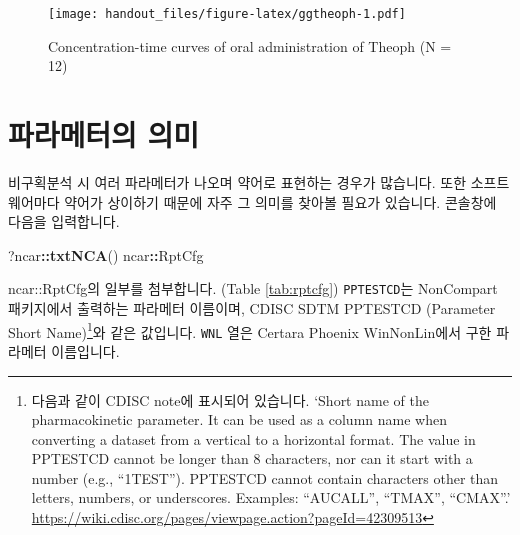 \documentclass[12pt,]{krantz}
\newenvironment{Shaded}{\begin{snugshade}}{\end{snugshade}}
\newcommand{\KeywordTok}[1]{\textcolor[rgb]{0.13,0.29,0.53}{\textbf{#1}}}
\newcommand{\OperatorTok}[1]{\textcolor[rgb]{0.81,0.36,0.00}{\textbf{#1}}}
\newcommand{\NormalTok}[1]{#1}
\let\rmarkdownfootnote\footnote%
\def\footnote{\protect\rmarkdownfootnote}
\begin{document}
\begin{figure}
\centering
\texttt{[image: handout\_files/figure-latex/ggtheoph-1.pdf]}
\caption{\label{fig:ggtheoph}Concentration-time curves of oral
administration of Theoph (N = 12)}
\end{figure}

\hypertarget{-}{%
\section{파라메터의 의미}\label{-}}

비구획분석 시 여러 파라메터가 나오며 약어로 표현하는 경우가 많습니다.
또한 소프트웨어마다 약어가 상이하기 때문에 자주 그 의미를 찾아볼 필요가
있습니다. 콘솔창에 다음을 입력합니다.

\begin{Shaded}
\begin{Highlighting}[]
\NormalTok{?ncar}\OperatorTok{::}\KeywordTok{txtNCA}\NormalTok{()}
\NormalTok{ncar}\OperatorTok{::}\NormalTok{RptCfg}
\end{Highlighting}
\end{Shaded}

ncar::RptCfg의 일부를 첨부합니다. (Table \ref{tab:rptcfg})
\texttt{PPTESTCD}는 NonCompart 패키지에서 출력하는 파라메터 이름이며,
CDISC SDTM PPTESTCD (Parameter Short Name)\footnote{다음과 같이 CDISC
  note에 표시되어 있습니다. `Short name of the pharmacokinetic
  parameter. It can be used as a column name when converting a dataset
  from a vertical to a horizontal format. The value in PPTESTCD cannot
  be longer than 8 characters, nor can it start with a number (e.g.,
  ``1TEST''). PPTESTCD cannot contain characters other than letters,
  numbers, or underscores. Examples: ``AUCALL'', ``TMAX'', ``CMAX''.'
  \url{https://wiki.cdisc.org/pages/viewpage.action?pageId=42309513}}와
같은 값입니다. \texttt{WNL} 열은 Certara Phoenix WinNonLin에서 구한
파라메터 이름입니다.
\end{document}
